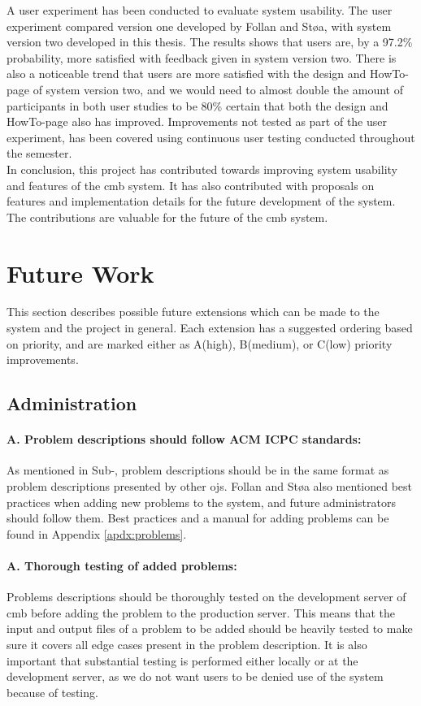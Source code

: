 A user experiment has been conducted to evaluate system usability. The user experiment compared version one developed by Follan and Støa, with system version two developed in this thesis. The results shows that users are, by a 97.2\% probability, more satisfied with feedback given in system version two. There is also a noticeable trend that users are more satisfied with the design and HowTo-page of system version two, and we would need to almost double the amount of participants in both user studies to be 80\% certain that both the design and HowTo-page also has improved. Improvements not tested as part of the user experiment, has been covered using continuous user testing conducted throughout the semester. \\

In conclusion, this project has contributed towards improving system usability and features of the \gls{cmb} system. It has also contributed with proposals on features and implementation details for the future development of the system. The contributions are valuable for the future of the \gls{cmb} system.


\section{Future Work}
\label{sec:future-work}
This section describes possible future extensions which can be made to the system and the project in general. Each extension has a suggested ordering based on priority, and are marked either as A(high), B(medium), or C(low) priority improvements.

\subsection*{Administration}

\paragraph*{A. Problem descriptions should follow ACM ICPC standards:} As mentioned in Sub-, problem descriptions should be in the same format as problem descriptions presented by other \glspl{oj}. Follan and Støa also mentioned best practices when adding new problems to the system, and future administrators should follow them. Best practices and a manual for adding problems can be found in Appendix \ref{apdx:problems}.

\paragraph*{A. Thorough testing of added problems:} Problems descriptions should be thoroughly tested on the development server of \gls{cmb} before adding the problem to the production server. This means that the input and output files of a problem to be added should be heavily tested to make sure it covers all edge cases present in the problem description. It is also important that substantial testing is performed either locally or at the development server, as we do not want users to be denied use of the system because of testing.


